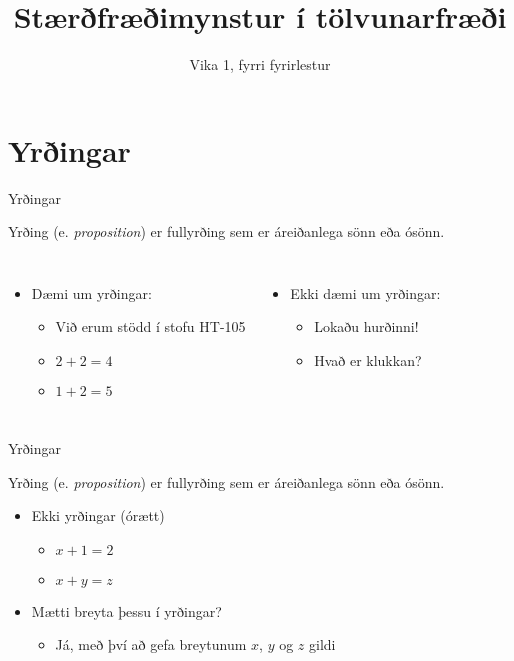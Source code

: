 \documentclass[handout]{beamer}
\title{Stærðfræðimynstur í tölvunarfræði}
\subtitle{Vika 1, fyrri fyrirlestur}
\begin{document}
\begin{frame}
\titlepage
\end{frame}

\section{Yrðingar}

\begin{frame}{Yrðingar}
\begin{tcolorbox}[title=Yrðing]
Yrðing (e. \emph{proposition}) er fullyrðing sem er áreiðanlega sönn eða ósönn.
\end{tcolorbox}
\begin{columns}
\begin{itemize}
 \item Dæmi um yrðingar:
 \begin{itemize}
  \item Við erum stödd í stofu HT-105
  \item $2 + 2 = 4$
  \item $1 + 2 = 5$
 \end{itemize}
\end{itemize}
\begin{itemize}
 \item Ekki dæmi um yrðingar:
 \begin{itemize}
  \item Lokaðu hurðinni!
  \item Hvað er klukkan?
 \end{itemize}
\end{itemize}
\end{columns}
\end{frame}

\begin{frame}{Yrðingar}
\begin{tcolorbox}[title=Yrðing]
Yrðing (e. \emph{proposition}) er fullyrðing sem er áreiðanlega sönn eða ósönn.
\end{tcolorbox}
\begin{itemize}
 \item Ekki yrðingar (órætt)
 \begin{itemize}
  \item $x + 1 = 2$
  \item $x + y = z$
 \end{itemize} \pause
 \item Mætti breyta þessu í yrðingar?\pause
 \begin{itemize}
  \item Já, með því að gefa breytunum $x$, $y$ og $z$ gildi
 \end{itemize}
\end{itemize}
\end{frame}
\end{document}

